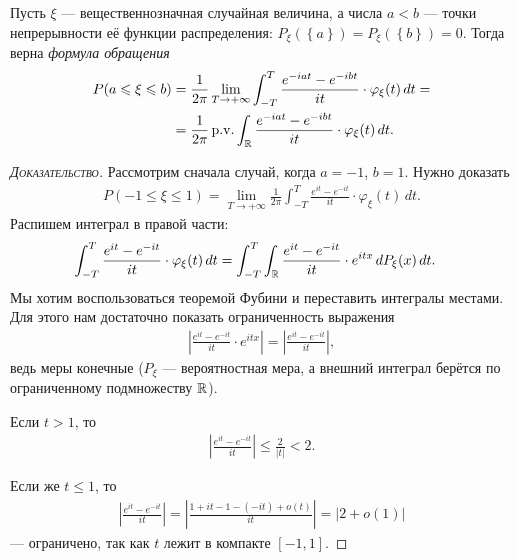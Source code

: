 \documentclass[../main.tex]{subfiles}
\begin{document}
\begin{thm}
 \label{theorem:inversing_formula}
 Пусть $ \xi $ --- вещественнозначная случайная величина, а числа $ a < b $ --- точки непрерывности её функции распределения: $ P_\xi(\left\{ a \right\}) = P_\xi(\left\{ b \right\}) = 0 $. Тогда верна \emph{формула обращения}
 \begin{align*}
  P(a \leqslant \xi \leqslant b) &= \frac{1}{2\pi} \lim_{T \to +\infty} \int_{-T}^{T}  \frac{e^{-iat}-e^{-ibt}}{it} \cdot \varphi_\xi(t)\,dt = \\
  &= \frac{1}{2\pi} \operatorname{p.\!v.} \int_{\mathbb{R}} \frac{e^{-iat}-e^{-ibt}}{it}\cdot\varphi_\xi(t)\,dt.
 \end{align*}
\end{thm}
\begin{proof}[\normalfont\textsc{Доказательство}]
 Рассмотрим сначала случай, когда $ a = -1 $, $ b = 1 $. Нужно доказать
 \begin{align*}
  P(-1 \leqslant \xi \leqslant 1) = \lim_{T \to +\infty} \frac{1}{2\pi}\int_{-T}^{T} \frac{e^{it}-e^{-it}}{it}\cdot\varphi_\xi(t)\,dt.
 \end{align*} Распишем интеграл в правой части:
 \begin{align*}
  \int_{-T}^{T} \frac{e^{it}-e^{-it}}{it}\cdot\varphi_\xi(t)\,dt &= \int_{-T}^{T} \int_\mathbb{R} \frac{e^{it}-e^{-it}}{it} \cdot e^{itx}\,dP_\xi(x)\,dt.
 \end{align*} Мы хотим воспользоваться теоремой Фубини и переставить интегралы местами. Для этого нам достаточно показать ограниченность выражения
 \begin{align*}
  \left| \frac{e^{it}-e^{-it}}{it} \cdot e^{itx} \right| = \left| \frac{e^{it}-e^{-it}}{it} \right|,
 \end{align*} ведь меры конечные ($ P_\xi $ --- вероятностная мера, а внешний интеграл берётся по ограниченному подмножеству $ \mathbb{R} $). 

 Если $ t > 1 $, то
 \begin{align*}
  \left| \frac{e^{it}-e^{-it}}{it} \right| \leqslant \frac{2}{\left| t \right|} < 2.
 \end{align*} 

 Если же $ t \leqslant 1 $, то
 \begin{align*}
  \left| \frac{e^{it}-e^{-it}}{it} \right| = \left| \frac{1 + it - 1 - (-it) + o(t)}{it} \right| = \left| 2 + o(1) \right|
 \end{align*} --- ограничено, так как $ t $ лежит в компакте  $ [-1,1] $.


\end{proof}
\end{document}
